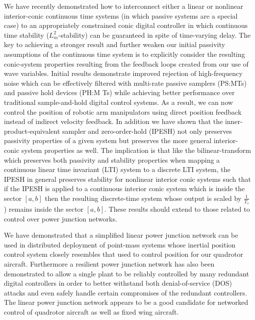             We have recently demonstrated how to interconnect either a linear or nonlinear interior-conic continuous time systems (in which passive systems are a special case) to an appropriately constrained conic digital controller in which continuous time stability ($L_m^2$-stability) can be guaranteed in spite of time-varying delay.  The key to achieving a stronger result and further weaken our initial passivity assumptions of the continuous time system is to explicitly consider the resulting conic-system properties resulting from the feedback loops created from our use of wave variables.  Initial results demonstrate improved rejection of high-frequency noise which can be effectively filtered with multi-rate passive samplers (PS:MTs) and passive hold devices (PH:M Ts) while achieving better performance over traditional sample-and-hold digital control systems.  As a result, we can now control the position of robotic arm manipulators using direct position feedback instead of indirect velocity feedback.  In addition we have shown that the inner-product-equivalent sampler and zero-order-hold (IPESH) not only preserves passivity properties of a given system but preserves the more general interior-conic system properties as well.  The implication is that like the bilinear-transform which preserves both passivity and stability properties when mapping a continuous linear time invariant (LTI) system to a discrete LTI system, the IPESH in general preserves stability for nonlinear interior conic systems such that if the IPESH is applied to a continuous interior conic system which is inside the sector $[a,b]$ then the resulting discrete-time system whose output is scaled by $\frac{1}{T_s}$) remains inside the sector $[a,b]$.  These results should extend to those related to control over power junction networks.

            We have demonstrated that a simplified linear power junction network can be used in distributed deployment of point-mass systems whose inertial position control system closely resembles that used to control position for our quadrotor aircraft.  Furthermore a resilient power junction network has also been demonstrated to allow a single plant to be reliably controlled by many redundant digital controllers in order to better withstand both denial-of-service (DOS) attacks and even safely handle certain compromises of the redundant controllers.  The linear power junction network appears to be a good candidate for networked control of quadrotor aircraft as well as fixed wing aircraft.

